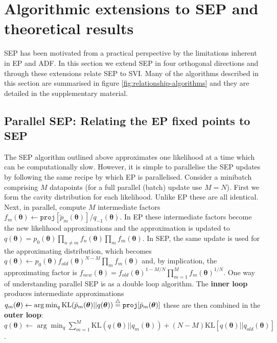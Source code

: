 \section{Algorithmic extensions to SEP and theoretical results}
%
SEP has been motivated from a practical perspective by the limitations inherent in EP and ADF. In this section we extend SEP in four orthogonal directions and through these extensions relate SEP to SVI. Many of the algorithms described in this section are summarised in figure \ref{fig:relationship-algorithms} and they are detailed in the supplementary material.


%
\subsection{Parallel SEP: Relating the EP fixed points to SEP}
%

The SEP algorithm outlined above approximates one likelihood at a time which can be computationally slow. However, it is simple to parallelise the SEP updates by following the same recipe by which EP is parallelised. Consider a minibatch comprising $M$ datapoints (for a full parallel (batch) update use $M=N$). First we form the cavity distribution for each likelihood. Unlike EP these are all identical. Next, in parallel, compute $M$ intermediate factors $f_m(\bm{\theta}) \leftarrow \mathtt{proj}[\tilde{p}_m(\bm{\theta})] / q_{-1}(\bm{\theta})$. In EP these intermediate factors become the new likelihood approximations and the approximation is updated to $q(\bm{\theta}) = p_0(\bm{\theta}) \prod_{n \ne m} f_n(\bm{\theta}) \prod_{m} f_m(\bm{\theta}) $. In SEP, the same update is used for the approximating distribution, which becomes $q(\bm{\theta}) \leftarrow p_0(\bm{\theta}) f_{old}(\bm{\theta})^{N-M} \prod_{m} f_m(\bm{\theta}) $ and, by implication, the approximating factor is $f_{new}(\bm{\theta}) = f_{old}(\bm{\theta})^{1-M/N} \prod_{m=1}^M f_m(\bm{\theta})^{1/N}$. One way of understanding parallel SEP is as a double loop algorithm. The \textbf{inner loop} produces intermediate approximations  $q_m(\bm{\theta}) \leftarrow \arg\min_q \mathrm{KL}(\tilde{p}_m(\bm{\theta}) ||q(\bm{\theta})) \buildrel\triangle\over = \mathtt{proj}[\tilde{p}_m(\bm{\theta})]$ these are then combined in the \textbf{outer loop}: $q(\bm{\theta}) \leftarrow \arg\min_q \sum_{m=1}^M \mathrm{KL}(q(\bm{\theta}) ||q_m(\bm{\theta})) + (N-M) \mathrm{KL}[q(\bm{\theta}) || q_{old}(\bm{\theta})]$.

